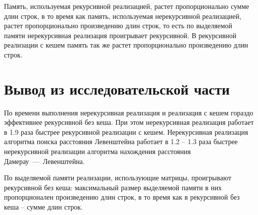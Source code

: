 Память, используемая рекурсивной реализацией, растет пропорционально сумме длин строк, в то время как память, используемая нерекурсивной реализацией, растет пропорционально произведению длин строк, то есть по выделяемой памяти нерекурсивная реализация проигрывает рекурсивной. В рекурсивной реализации с кешем память так же растет пропорционально произведению длин строк.

\section*{Вывод из исследовательской части}

По времени выполнения нерекурсивная реализация и реализация с кешем гораздо эффективнее  рекурсивной без кеша. При этом нерекурсивная реализация работает в 1.9 раза быстрее рекурсивной реализации с кешем. Нерекурсивная реализация алгоритма поиска расстояния Левенштейна работает в 1.2 -- 1.3 раза быстрее нерекурсивной реализации алгоритма нахождения расстояния Дамерау~---~Левенштейна.

По выделяемой памяти реализации, использующие матрицы, проигрывают рекурсивной без кеша: максимальный размер выделяемой памяти в них пропорционален произведению длин строк, в то время как в рекурсивной без кеша -- сумме длин строк.
